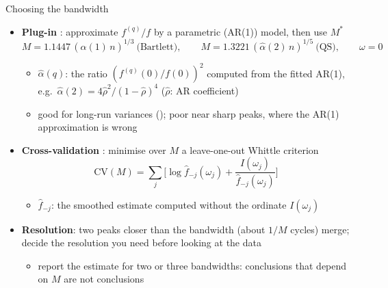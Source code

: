 \begin{frame}{Choosing the bandwidth}
\itemsize{\small}
\begin{itemize}
    \item \textbf{Plug-in} : approximate $f^{(q)}/f$ by a parametric (AR(1)) model, then use $M^*$
    \[ M = 1.1447\,(\hat\alpha(1)\,n)^{1/3} \ \text{(Bartlett)}, \qquad M = 1.3221\,(\hat\alpha(2)\,n)^{1/5} \ \text{(QS)}, \qquad \omega = 0 \]
    \begin{itemize}
        \item $\hat\alpha(q)$: the ratio $(f^{(q)}(0)/f(0))^2$ computed from the fitted AR(1), e.g.\ $\hat\alpha(2) = 4\hat\rho^2/(1 - \hat\rho)^4$ ($\hat\rho$: AR coefficient)
        \item good for long-run variances (); poor near sharp peaks, where the AR(1) approximation is wrong
    \end{itemize}
    \item \textbf{Cross-validation} : minimise over $M$ a leave-one-out Whittle criterion
    \[ \mathrm{CV}(M) = \sum_j\Big[\log\hat f_{-j}(\omega_j) + \frac{I(\omega_j)}{\hat f_{-j}(\omega_j)}\Big] \]
    \begin{itemize}
        \item $\hat f_{-j}$: the smoothed estimate computed without the ordinate $I(\omega_j)$
    \end{itemize}
    \item \textbf{Resolution}: two peaks closer than the bandwidth (about $1/M$ cycles) merge; decide the resolution you need before looking at the data
    \begin{itemize}
        \item report the estimate for two or three bandwidths: conclusions that depend on $M$ are not conclusions
    \end{itemize}
\end{itemize}
\end{frame}


